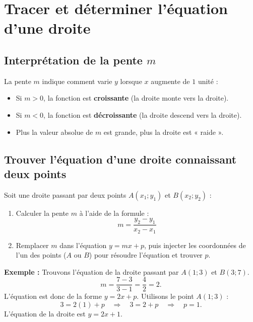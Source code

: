 \documentclass[../main.tex]{subfiles}
\begin{document}
\section{Tracer et déterminer l'équation d'une droite}

\subsection{Interprétation de la pente $m$}
\begin{propriete}
La pente $m$ indique comment varie $y$ lorsque $x$ augmente de $1$ unité :
\begin{itemize}
  \item Si \textbf{$m > 0$}, la fonction est \textbf{croissante} (la droite monte vers la droite).
  \item Si \textbf{$m < 0$}, la fonction est \textbf{décroissante} (la droite descend vers la droite).
  \item Plus la valeur absolue de $m$ est grande, plus la droite est « raide ».
\end{itemize}
\end{propriete}

\subsection{Trouver l'équation d'une droite connaissant deux points}

\begin{methode}
Soit une droite passant par deux points $A(x_1; y_1)$ et $B(x_2; y_2)$ :
\begin{enumerate}
  \item Calculer la pente $m$ à l'aide de la formule :
  \[
  m = \frac{y_2 - y_1}{x_2 - x_1}
  \]
  \item Remplacer $m$ dans l'équation $y = mx + p$, puis injecter les coordonnées de l'un des points ($A$ ou $B$) pour résoudre l'équation et trouver $p$.
\end{enumerate}
\end{methode}

\textbf{Exemple :} Trouvons l'équation de la droite passant par $A(1; 3)$ et $B(3; 7)$.
\[
m = \frac{7 - 3}{3 - 1} = \frac{4}{2} = 2.
\]
L'équation est donc de la forme $y = 2x + p$. Utilisons le point $A(1; 3)$ :
\[
3 = 2(1) + p \quad\Longrightarrow\quad 3 = 2 + p \quad\Longrightarrow\quad p = 1.
\]
L'équation de la droite est \textbf{$y = 2x + 1$}.
\end{document}
